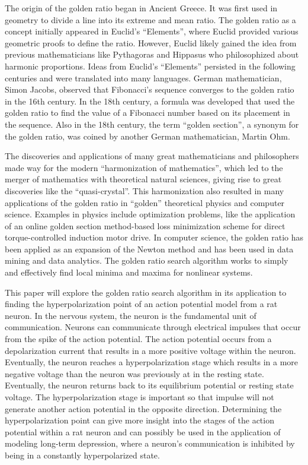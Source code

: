 \documentclass[linenumbers,RNAAS,trackchanges]{aastex631}
\begin{document}
The origin of the golden ratio began in Ancient Greece.\cite{stakhov_2014} It was first used in geometry to divide a line into its extreme and mean ratio\cite{stakhov_2014}. The golden ratio as a concept initially appeared in Euclid’s “Elements”, where Euclid provided various geometric proofs to define the ratio\cite{stakhov_2014}. However, Euclid likely gained the idea from previous mathematicians like Pythagoras and Hippasus who philosophized about harmonic proportions\cite{stakhov_2014}. Ideas from Euclid’s “Elements” persisted in the following centuries and were translated into many languages\cite{stakhov_2014}. German mathematician, Simon Jacobs, observed that Fibonacci’s sequence converges to the golden ratio in the 16th century\cite{stakhov_2014}. In the 18th century, a formula was developed that used the golden ratio to find the value of a Fibonacci number based on its placement in the sequence\cite{stakhov_2014}. Also in the 18th century, the term “golden section”, a synonym for the golden ratio, was coined by another German mathematician, Martin Ohm\cite{stakhov_2014}. 

The discoveries and applications of many great mathematicians and philosophers made way for the modern “harmonization of mathematics”, which led to the merger of mathematics with theoretical natural sciences, giving rise to great discoveries like the “quasi-crystal”\cite{stakhov_2014}. This harmonization also resulted in many applications of the golden ratio in “golden” theoretical physics and computer science. Examples in physics include optimization problems, like the application of an online golden section method-based loss minimization scheme for direct torque-controlled induction motor drive\cite{8709593}. In computer science, the golden ratio has been applied as an expansion of the Newton method and has been used in data mining and data analytics. The golden ratio search algorithm works to simply and effectively find local minima and maxima for nonlinear systems.

This paper will explore the golden ratio search algorithm in its application to finding the hyperpolarization point of an action potential model from a rat neuron\cite{5333075}. In the nervous system, the neuron is the fundamental unit of communication. Neurons can communicate through electrical impulses that occur from the spike of the action potential. The action potential occurs from a depolarization current that results in a more positive voltage within the neuron. Eventually, the neuron reaches a hyperpolarization stage which results in a more negative voltage than the neuron was previously at in the resting state. Eventually, the neuron returns back to its equilibrium potential or resting state voltage. The hyperpolarization stage is important so that impulse will not generate another action potential in the opposite direction. Determining the hyperpolarization point can give more insight into the stages of the action potential within a rat neuron and can possibly be used in the application of modeling long-term depression, where a neuron’s communication is inhibited by being in a constantly hyperpolarized state.
 
\end{document}
